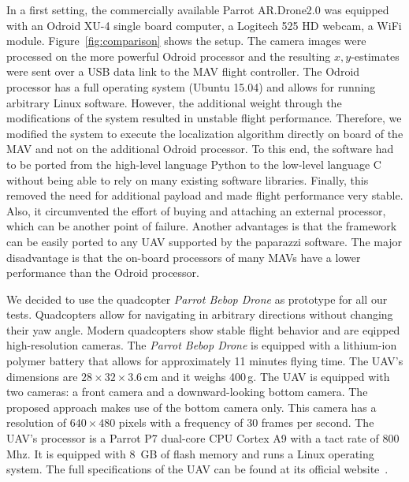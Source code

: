 \documentclass{report}
\begin{document}
In a first setting, the commercially available Parrot AR.Drone2.0 was
equipped with an Odroid XU-4 single board computer, a Logitech 525 HD
webcam, a WiFi module. Figure~\ref{fig:comparison} shows the
setup. The camera images were processed on the more powerful Odroid
processor and the resulting $x,y$-estimates were sent over a USB data
link to the MAV flight controller. The Odroid processor has a full
operating system (Ubuntu 15.04) and allows for running arbitrary Linux
software.  However, the additional weight through the modifications of
the system resulted in unstable flight performance. Therefore, we
modified the system to execute the localization algorithm directly on
board of the MAV and not on the additional Odroid processor. To this
end, the software had to be ported from the high-level language Python
to the low-level language C without being able to rely on many
existing software libraries.  Finally, this removed the need for
additional payload and made flight performance very stable. Also, it
circumvented the effort of buying and attaching an external processor,
which can be another point of failure. Another advantages is that the
framework can be easily ported to any UAV supported by the paparazzi
software. The major disadvantage is that the on-board processors of
many MAVs have a lower performance than the Odroid processor.

We decided to use the quadcopter \emph{Parrot Bebop Drone} as
prototype for all our tests. Quadcopters allow for navigating in
arbitrary directions without changing their yaw angle. Modern
quadcopters show stable flight behavior and are eqipped
high-resolution cameras. The \emph{Parrot Bebop Drone} is equipped
with a lithium-ion polymer battery that allows for approximately 11
minutes flying time. The UAV's dimensions are
$28 \times 32 \times 3.6$\,cm and it weighs 400\,g. The UAV is
equipped with two cameras: a front camera and a downward-looking
bottom camera. The proposed approach makes use of the bottom camera
only. This camera has a resolution of $640 \times 480$ pixels with a
frequency of 30 frames per second. The UAV's processor is a Parrot P7
dual-core CPU Cortex A9 with a tact rate of 800\,Mhz. It is equipped
with 8~GB of flash memory and runs a Linux operating system. The full
specifications of the UAV can be found at its official
website~\cite{bebop}.
\end{document}
